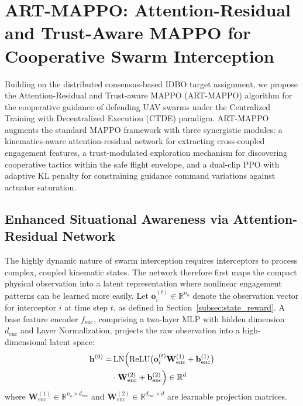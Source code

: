 \documentclass[lettersize,journal]{IEEEtran}
\begin{document}
\section{ART-MAPPO: Attention-Residual and Trust-Aware MAPPO for Cooperative Swarm Interception}
\label{sec:cooperative_algorithm}

Building on the distributed consensus-based IDBO target assignment, we propose the Attention-Residual and Trust-aware MAPPO (ART-MAPPO) algorithm for the cooperative guidance of defending UAV swarms under the Centralized Training with Decentralized Execution (CTDE) paradigm. ART-MAPPO augments the standard MAPPO framework with three synergistic modules: a kinematics-aware attention-residual network for extracting cross-coupled engagement features, a trust-modulated exploration mechanism for discovering cooperative tactics within the safe flight envelope, and a dual-clip PPO with adaptive KL penalty for constraining guidance command variations against actuator saturation.

\subsection{Enhanced Situational Awareness via Attention-Residual Network}
\label{subsec:attention_residual}

The highly dynamic nature of swarm interception requires interceptors to process complex, coupled kinematic states. The network therefore first maps the compact physical observation into a latent representation where nonlinear engagement patterns can be learned more easily. Let $\mathbf{o}_i^{(t)} \in \mathbb{R}^{n_o}$ denote the observation vector for interceptor $i$ at time step $t$, as defined in Section~\ref{subsec:state_reward}. A base feature encoder $f_{\mathrm{enc}}$, comprising a two-layer MLP with hidden dimension $d_{\mathrm{enc}}$ and Layer Normalization, projects the raw observation into a high-dimensional latent space:
\begin{equation}
\label{eq:encoder}
\begin{split}
\mathbf{h}^{(0)} =& \operatorname{LN}\Bigl(\operatorname{ReLU}\bigl(\mathbf{o}_i^{(t)}\mathbf{W}_{\mathrm{enc}}^{(1)} + \mathbf{b}_{\mathrm{enc}}^{(1)}\bigr) \\
&\cdot \mathbf{W}_{\mathrm{enc}}^{(2)} + \mathbf{b}_{\mathrm{enc}}^{(2)}\Bigr) \in \mathbb{R}^{d}
\end{split}
\end{equation}
where $\mathbf{W}_{\mathrm{enc}}^{(1)} \in \mathbb{R}^{n_o \times d_{\mathrm{enc}}}$ and $\mathbf{W}_{\mathrm{enc}}^{(2)} \in \mathbb{R}^{d_{\mathrm{enc}} \times d}$ are learnable projection matrices.
\end{document}
